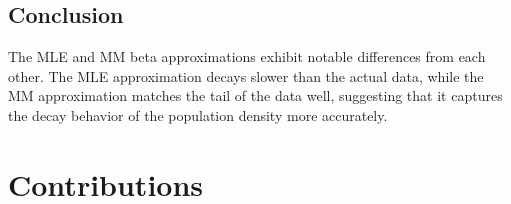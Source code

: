 \documentclass[12pt, letterpaper]{report}
\begin{document}
\section{Conclusion}
The MLE and MM beta approximations exhibit notable differences from each other.
The MLE approximation decays slower than the actual data, while the MM approximation matches the tail of the data well, suggesting that it captures the decay behavior of the population density more accurately.

\chapter{Contributions}
\end{document}
